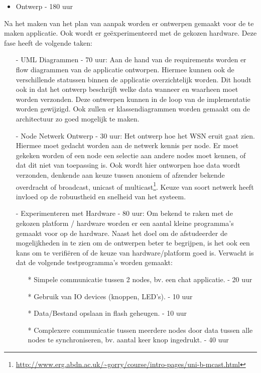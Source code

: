 \documentclass{../local}
\begin{document}
\begin{itemize}
\item Ontwerp - 180 uur
\end{itemize}
Na het maken van het plan van aanpak worden er ontwerpen gemaakt voor de te maken applicatie. Ook wordt er geëxperimenteerd met de gekozen hardware. Deze fase heeft de volgende taken:

\begin{itemize}
\item[-] UML Diagrammen - 70 uur: Aan de hand van de requirements worden er flow diagrammen van de applicatie ontworpen. Hiermee kunnen ook de verschillende statussen binnen de applicatie overzichtelijk worden. Dit houdt ook in dat het ontwerp beschrijft welke data wanneer en waarheen moet worden verzonden. Deze ontwerpen kunnen in de loop van de implementatie worden gewijzigd. Ook zullen er klassendiagrammen worden gemaakt om de architectuur zo goed mogelijk te maken.

\item[-] Node Netwerk Ontwerp - 30 uur: Het ontwerp hoe het WSN eruit gaat zien. Hiermee moet gedacht worden aan de netwerk kennis per node. Er moet gekeken worden of een node een selectie aan andere nodes moet kennen, of dat dit niet van toepassing is. Ook wordt hier ontworpen hoe data wordt verzonden, denkende aan keuze tussen anoniem of afzender bekende overdracht of broadcast, unicast of multicast\footnote{\url{http://www.erg.abdn.ac.uk/~gorry/course/intro-pages/uni-b-mcast.html}}. Keuze van soort netwerk heeft invloed op de robuustheid en snelheid van het systeem.

\item[-] Experimenteren met Hardware - 80 uur: Om bekend te raken met de gekozen platform / hardware worden er een aantal kleine programma's gemaakt voor op de hardware. Naast het doel om de afstudeerder de mogelijkheden in te zien om de ontwerpen beter te begrijpen, is het ook een kans om te verifiëren of de keuze van hardware/platform goed is. Verwacht is dat de volgende testprogramma's worden gemaakt:
\begin{itemize}
\item[*] Simpele communicatie tussen 2 nodes, bv. een chat applicatie. - 20 uur
\item[*] Gebruik van IO devices (knoppen, LED's). - 10 uur
\item[*] Data/Bestand opslaan in flash geheugen. - 10 uur
\item[*] Complexere communicatie tussen meerdere nodes door data tussen alle nodes te synchroniseren, bv. aantal keer knop ingedrukt. - 40 uur
\end{itemize}
\end{itemize}
\end{document}
